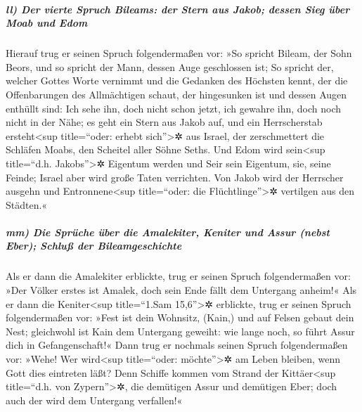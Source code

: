 \hypertarget{ll-der-vierte-spruch-bileams-der-stern-aus-jakob-dessen-sieg-uxfcber-moab-und-edom}{%
\subparagraph{ll) Der vierte Spruch Bileams: der Stern aus Jakob; dessen
Sieg über Moab und
Edom}\label{ll-der-vierte-spruch-bileams-der-stern-aus-jakob-dessen-sieg-uxfcber-moab-und-edom}}

Hierauf trug er seinen Spruch folgendermaßen vor: »So
spricht Bileam, der Sohn Beors, und so spricht der Mann, dessen Auge
geschlossen ist; So spricht der, welcher Gottes Worte
vernimmt und die Gedanken des Höchsten kennt, der die Offenbarungen des
Allmächtigen schaut, der hingesunken ist und dessen Augen enthüllt sind:
Ich sehe ihn, doch nicht schon jetzt, ich gewahre ihn,
doch noch nicht in der Nähe; es geht ein Stern aus Jakob auf, und ein
Herrscherstab ersteht\textless sup title=``oder: erhebt
sich''\textgreater✲ aus Israel, der zerschmettert die Schläfen Moabs,
den Scheitel aller Söhne Seths. Und Edom wird
sein\textless sup title=``d.h. Jakobs''\textgreater✲ Eigentum werden und
Seir sein Eigentum, sie, seine Feinde; Israel aber wird große Taten
verrichten. Von Jakob wird der Herrscher ausgehn und
Entronnene\textless sup title=``oder: die Flüchtlinge''\textgreater✲
vertilgen aus den Städten.«

\hypertarget{mm-die-spruxfcche-uxfcber-die-amalekiter-keniter-und-assur-nebst-eber-schluuxdf-der-bileamgeschichte}{%
\subparagraph{mm) Die Sprüche über die Amalekiter, Keniter und Assur
(nebst Eber); Schluß der
Bileamgeschichte}\label{mm-die-spruxfcche-uxfcber-die-amalekiter-keniter-und-assur-nebst-eber-schluuxdf-der-bileamgeschichte}}

Als er dann die Amalekiter erblickte, trug er seinen
Spruch folgendermaßen vor: »Der Völker erstes ist Amalek, doch sein Ende
fällt dem Untergang anheim!« Als er dann die
Keniter\textless sup title=``1.Sam 15,6''\textgreater✲ erblickte, trug
er seinen Spruch folgendermaßen vor: »Fest ist dein Wohnsitz, (Kain,)
und auf Felsen gebaut dein Nest; gleichwohl ist Kain dem
Untergang geweiht: wie lange noch, so führt Assur dich in
Gefangenschaft!« Dann trug er nochmals seinen Spruch
folgendermaßen vor: »Wehe! Wer wird\textless sup title=``oder:
möchte''\textgreater✲ am Leben bleiben, wenn Gott dies eintreten läßt?
Denn Schiffe kommen vom Strand der Kittäer\textless sup
title=``d.h. von Zypern''\textgreater✲, die demütigen Assur und
demütigen Eber; doch auch der wird dem Untergang verfallen!«

